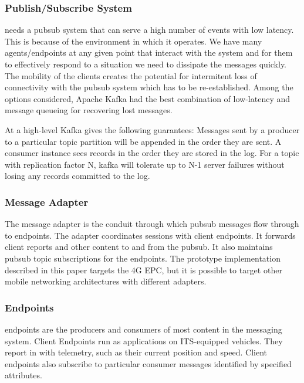 \subsubsection{Publish/Subscribe System}

\name needs a pubsub system that can serve a high number of events
with low latency. This is because of the environment in which it
operates.  We have many agents/endpoints at any given point that
interact with the system and for them to effectively respond to a
situation we need to dissipate the messages quickly. The mobility of
the clients creates the potential for intermitent loss of connectivity
with the pubsub system which has to be re-established. Among the options
considered, Apache Kafka had the best combination of low-latency and
message queueing for recovering lost messages.

At a high-level Kafka gives the following guarantees: Messages sent by a 
producer to a particular topic partition will be appended in the order they are
sent. A consumer instance sees records in the order they are stored in the log. 
For a topic with replication factor N, kafka will tolerate up to N-1 server 
failures without losing any records committed to the log.

\subsubsection{Message Adapter}

The \name message adapter is the conduit through which pubsub
messages flow through to endpoints. The adapter coordinates sessions
with client endpoints. It forwards client reports and other content to
and from the pubsub. It also maintains pubsub topic subscriptions for
the endpoints. The prototype implementation described in this
paper targets the 4G EPC, but it is possible to target other mobile
networking architectures with different adapters.

\subsubsection{Endpoints}

\name endpoints are the producers and consumers of most content in
the messaging system. Client Endpoints run as applications on
ITS-equipped vehicles.  They report in with telemetry, such as their
current position and speed.  Client endpoints also subscribe to
particular consumer messages identified by specified attributes.

